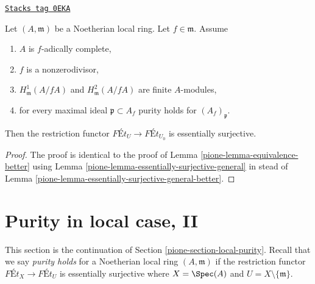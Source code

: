 \begin{lemma}[Equivalence]
\label{pione-lemma-equivalence}
\href{https://stacks.math.columbia.edu/tag/0EKA}{\texttt{Stacks tag 0EKA}}

Let $(A, \mathfrak m)$ be a Noetherian local ring.
Let $f \in \mathfrak m$. Assume
\begin{enumerate}
\item $A$ is $f$-adically complete,
\item $f$ is a nonzerodivisor,
\item $H^1_\mathfrak m(A/fA)$ and $H^2_\mathfrak m(A/fA)$ are finite
$A$-modules,
\item for every maximal ideal $\mathfrak p \subset A_f$
purity holds for $(A_f)_\mathfrak p$.
\end{enumerate}
Then the restriction functor $\textit{F\'Et}_U \to \textit{F\'Et}_{U_0}$
is essentially surjective.
\end{lemma}

\begin{proof}

The proof is identical to the proof of
Lemma \ref{pione-lemma-equivalence-better}
using
Lemma \ref{pione-lemma-essentially-surjective-general}
in stead of
Lemma \ref{pione-lemma-essentially-surjective-general-better}.
\end{proof}

\section{Purity in local case, II}
\label{pione-section-local-purity-II}
This section is the continuation of Section \ref{pione-section-local-purity}.
Recall that we say {\it purity holds} for a Noetherian local ring
$(A, \mathfrak m)$ if the restriction functor
$\textit{F\'Et}_X \to \textit{F\'Et}_U$ is essentially
surjective where $X = \Spec(A)$ and $U = X \setminus \{\mathfrak m\}$.

